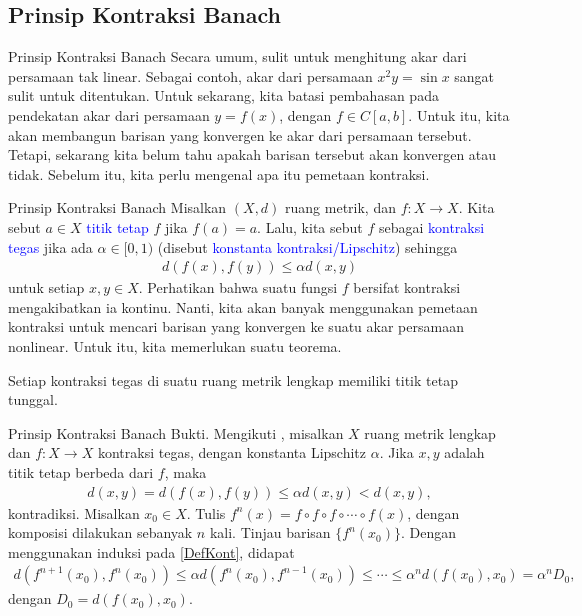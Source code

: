 \documentclass[xcolor={dvipsnames}, 9pt]{beamer}
\renewcommand{\emph}[1]{\textcolor{Blue}{#1}}
\begin{document}
	\subsection{Prinsip Kontraksi Banach}
	\begin{frame}{Prinsip Kontraksi Banach}
		Secara umum, sulit untuk menghitung akar dari persamaan tak linear. Sebagai contoh, akar dari persamaan $x^2y = \sin x$ sangat sulit untuk ditentukan. \newline
		Untuk sekarang, kita batasi pembahasan pada pendekatan akar dari persamaan $y=f(x)$, dengan $f\in C[a,b]$. \newline
		Untuk itu, kita akan membangun barisan yang konvergen ke akar dari persamaan tersebut. Tetapi, sekarang kita belum tahu apakah barisan tersebut akan konvergen atau tidak. Sebelum itu, kita perlu mengenal apa itu pemetaan kontraksi.
	\end{frame}
	\begin{frame}{Prinsip Kontraksi Banach}
		Misalkan $(X,d)$ ruang metrik, dan $f:X\to X$. Kita sebut $a\in X$ \emph{titik tetap} $f$ jika $f(a)=a$. Lalu, kita sebut $f$ sebagai \emph{kontraksi tegas} jika ada $\alpha\in[0,1)$ (disebut \emph{konstanta kontraksi/Lipschitz}) sehingga
		\begin{align}\label{DefKont}
			d(f(x),f(y))\leq\alpha d(x,y)
		\end{align}
		untuk setiap $x,y\in X$. \newline
		Perhatikan bahwa suatu fungsi $f$ bersifat kontraksi mengakibatkan ia kontinu. \newline 
		Nanti, kita akan banyak menggunakan pemetaan kontraksi untuk mencari barisan yang konvergen ke suatu akar persamaan nonlinear. Untuk itu, kita memerlukan suatu teorema.
		\begin{theorem}
			Setiap kontraksi tegas di suatu ruang metrik lengkap memiliki titik tetap tunggal.
		\end{theorem}
	\end{frame}
	\begin{frame}{Prinsip Kontraksi Banach}
		Bukti. Mengikuti \cite{Kainth2023Comprehensive}, misalkan $X$ ruang metrik lengkap dan $f:X\to X$ kontraksi tegas, dengan konstanta Lipschitz $\alpha$. \newline
		 Jika $x,y$ adalah titik tetap berbeda dari $f$, maka
		\begin{align*}
			d(x,y) = d(f(x),f(y)) \leq \alpha d(x,y) < d(x,y),
		\end{align*}
		kontradiksi. \newline
		 Misalkan $x_0\in X$. Tulis $f^n(x)=f\circ f\circ f\circ \cdots \circ f(x)$, dengan komposisi dilakukan sebanyak $n$ kali. Tinjau barisan $\{f^n(x_0)\}$. Dengan menggunakan induksi pada \eqref{DefKont}, didapat
		\begin{align*}
			d(f^{n+1}(x_0),f^n(x_0))\leq\alpha d(f^n(x_0),f^{n-1}(x_0))\leq\cdots\leq\alpha^nd(f(x_0),x_0)=\alpha^nD_0,
		\end{align*}
		dengan $D_0=d(f(x_0),x_0)$. 
	\end{frame}
\end{document}
